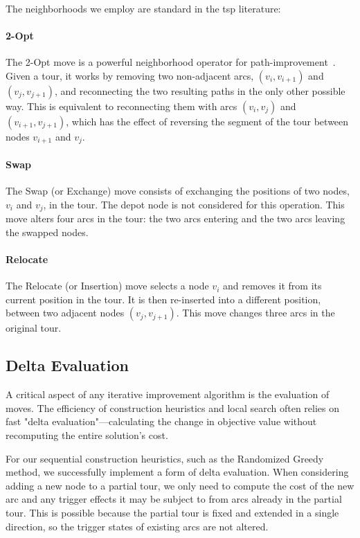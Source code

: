 \documentclass[twocolumn, switch]{article} %
\begin{document}
The neighborhoods we employ are standard in the \gls{tsp} literature:

\paragraph{2-Opt} The 2-Opt move is a powerful neighborhood operator for path-improvement~\cite{Croes1958}. Given a tour, it works by removing two non-adjacent arcs, $(v_i, v_{i+1})$ and $(v_j, v_{j+1})$, and reconnecting the two resulting paths in the only other possible way. This is equivalent to reconnecting them with arcs $(v_i, v_j)$ and $(v_{i+1}, v_{j+1})$, which has the effect of reversing the segment of the tour between nodes $v_{i+1}$ and $v_j$.

\paragraph{Swap} The Swap (or Exchange) move consists of exchanging the positions of two nodes, $v_i$ and $v_j$, in the tour. The depot node is not considered for this operation. This move alters four arcs in the tour: the two arcs entering and the two arcs leaving the swapped nodes.

\paragraph{Relocate} The Relocate (or Insertion) move selects a node $v_i$ and removes it from its current position in the tour. It is then re-inserted into a different position, between two adjacent nodes $(v_j, v_{j+1})$. This move changes three arcs in the original tour.

\subsection{Delta Evaluation}
A critical aspect of any iterative improvement algorithm is the evaluation of moves. The efficiency of construction heuristics and local search often relies on fast "delta evaluation"—calculating the change in objective value without recomputing the entire solution's cost.

For our sequential construction heuristics, such as the Randomized Greedy method, we successfully implement a form of delta evaluation. When considering adding a new node to a partial tour, we only need to compute the cost of the new arc and any trigger effects it may be subject to from arcs already in the partial tour. This is possible because the partial tour is fixed and extended in a single direction, so the trigger states of existing arcs are not altered.
\end{document}
